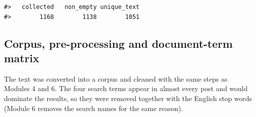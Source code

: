 \documentclass[
  10pt,
]{article}
\begin{document}
\begin{verbatim}
#>   collected   non_empty unique_text 
#>        1168        1138        1051
\end{verbatim}

\subsection{Corpus, pre-processing and document-term
matrix}\label{corpus-pre-processing-and-document-term-matrix}

The text was converted into a corpus and cleaned with the same steps as
Modules 4 and 6. The four search terms appear in almost every post and
would dominate the results, so they were removed together with the
English stop words (Module 6 removes the search names for the same
reason).
\end{document}
